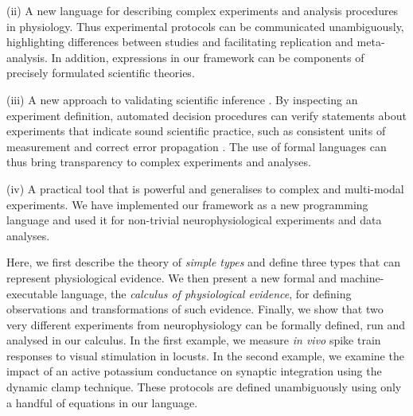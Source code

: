 (ii) A new language for describing complex experiments and analysis
procedures in physiology. Thus experimental protocols can be
communicated unambiguously, highlighting differences between studies
and facilitating replication and meta-analysis. In addition,
expressions in our framework can be components of precisely
formulated scientific theories.

(iii) A new approach to validating scientific inference
\citep{Editors2003, Editors2010, DeSchutter2010}. By inspecting an
experiment definition, automated decision procedures can verify
statements about experiments that indicate sound scientific practice,
such as consistent units of measurement \citep{Kennedy1997} and
correct error propagation \citep{Taylor1997}. The use of formal
languages can thus bring transparency to complex experiments and
analyses.

(iv) A practical tool that is powerful and generalises to complex and
multi-modal experiments. We have implemented our framework as a new
programming language and used it for non-trivial neurophysiological
experiments and data analyses.

Here, we first describe the theory of \emph{simple types}
\citep{Pierce2002} and define three types that can represent
physiological evidence. We then present a new formal and
machine-executable language, the \emph{calculus of physiological
  evidence}, for defining observations and transformations of such
evidence. Finally, we show that two very different experiments from
neurophysiology can be formally defined, run and analysed in our
calculus. In the first example, we measure \emph{in vivo} spike train
responses to visual stimulation in locusts. In the second example, we
examine the impact of an active potassium conductance on synaptic
integration using the dynamic clamp technique. These protocols are
defined unambiguously using only a handful of equations in our
language.

